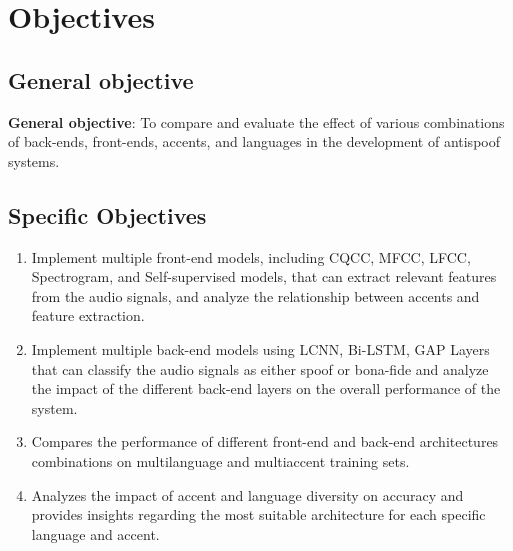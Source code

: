 \section{Objectives}

\subsection{General objective}

\textbf{General objective}: To compare and evaluate the effect of various combinations of back-ends, front-ends, accents, and languages in the development of antispoof systems.





\subsection{Specific Objectives}

\begin{enumerate}
    \item Implement multiple front-end models, including \acs{CQCC}, \acs{MFCC}, \acs{LFCC}, Spectrogram, and Self-supervised models, that can extract relevant features from the audio signals, and analyze the relationship between accents and feature extraction.
    \item Implement multiple back-end models using \acs{LCNN}, \acs{Bi-LSTM}, \acs{GAP} Layers that can classify the audio signals as either spoof or bona-fide and analyze the impact of the different back-end layers on the overall performance of the system.
    \item Compares the performance of different front-end and back-end architectures combinations on multilanguage  and multiaccent training sets. 
    \item Analyzes the impact of accent and language diversity on accuracy and provides insights regarding the most suitable architecture for each specific language and accent.
\end{enumerate}




\endinput

